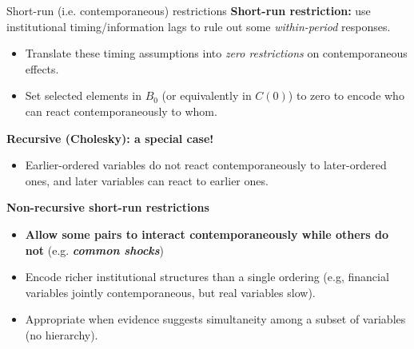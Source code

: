 \documentclass{beamer}
\begin{document}
\begin{frame}{Short-run (i.e. contemporaneous) restrictions}
\small
\textbf{Short-run restriction:} use institutional timing/information lags to rule out some \emph{within-period} responses.
\begin{itemize}
  \item Translate these timing assumptions into \emph{zero restrictions} on contemporaneous effects.
  \item Set selected elements in $B_0$ (or equivalently in $C(0)$) to zero to encode who can react contemporaneously to whom.
\end{itemize}

\textbf{Recursive (Cholesky): a special case!}
\begin{itemize}
  \item Earlier-ordered variables do not react contemporaneously to later-ordered ones, and later variables can react to earlier ones.
\end{itemize}

\textbf{Non-recursive short-run restrictions}
\begin{itemize}
  \item \textbf{Allow some pairs to interact contemporaneously while others do not} (e.g. \textit{\textbf{common shocks}})
  \item Encode richer institutional structures than a single ordering (e.g, financial variables jointly contemporaneous, but real variables slow).
  \item Appropriate when evidence suggests simultaneity among a subset of variables (no hierarchy).
\end{itemize}
\end{frame}
\end{document}
